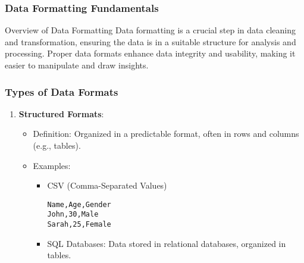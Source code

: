 \documentclass[aspectratio=169]{beamer}
\begin{document}
\begin{frame}[fragile]
    \frametitle{Data Formatting Fundamentals}
    \begin{block}{Overview of Data Formatting}
        Data formatting is a crucial step in data cleaning and transformation, ensuring the data is in a suitable structure for analysis and processing. Proper data formats enhance data integrity and usability, making it easier to manipulate and draw insights.
    \end{block}
\end{frame}

\begin{frame}[fragile]
    \frametitle{Types of Data Formats}
    \begin{enumerate}
        \item \textbf{Structured Formats}:
            \begin{itemize}
                \item Definition: Organized in a predictable format, often in rows and columns (e.g., tables).
                \item Examples: 
                    \begin{itemize}
                        \item CSV (Comma-Separated Values)
                        \begin{lstlisting}[basicstyle=\ttfamily]
Name,Age,Gender
John,30,Male
Sarah,25,Female
                        \end{lstlisting}
                        \item SQL Databases: Data stored in relational databases, organized in tables.
                    \end{itemize}
            \end{itemize}
    \end{enumerate}
\end{frame}
\end{document}
